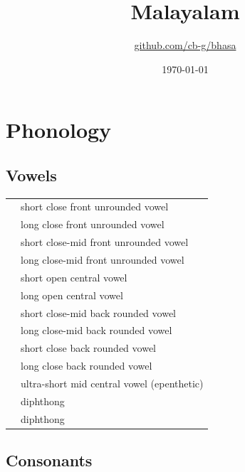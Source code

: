 \documentclass{article}
\title{Malayalam\\\ipa{[m5l5ja:\:l5m]}}
\author{\href{https://github.com/cb-g/bhasa}{github.com/cb-g/bhasa}}
\date{\today}
\begin{document}
\pagecolor{custom_bg}\color{custom_fg}
\maketitle\thispagestyle{empty}

\newpage\setcounter{page}{1}\section{Phonology}

\subsection{Vowels}

\begin{xltabular}{\textwidth}{lL}
   & short close front unrounded vowel \\
   & long close front unrounded vowel \\
   & short close-mid front unrounded vowel \\
   & long close-mid front unrounded vowel \\
   & short open central vowel \\
   & long open central vowel \\
   & short close-mid back rounded vowel \\
   & long close-mid back rounded vowel \\
   & short close back rounded vowel \\
   & long close back rounded vowel \\
   & ultra-short mid central vowel (epenthetic) \\
   & diphthong \\
   & diphthong \\
\end{xltabular}

\subsection{Consonants}
\end{document}
